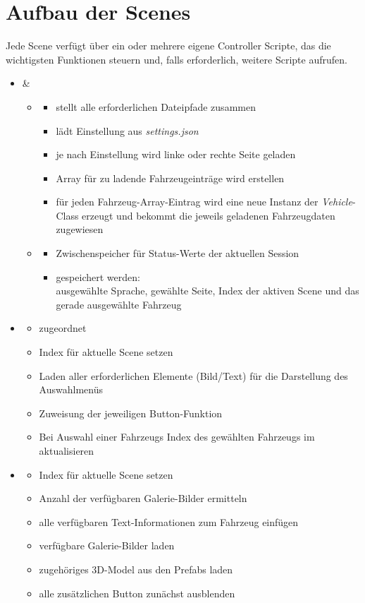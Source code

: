 \section{Aufbau der Scenes}
\label{sec:scenestruct}
%
Jede Scene verfügt über ein oder mehrere eigene Controller Scripte, das die wichtigsten Funktionen steuern und, falls erforderlich, weitere Scripte aufrufen.
%
\begin{itemize}
	\item \pres{} \rarr \dls{} \& \sss{}
	\begin{itemize}
		\item \dls{}
		\begin{itemize}
			\item stellt alle erforderlichen Dateipfade zusammen
			\item lädt Einstellung aus \emph{settings.json}
			\item je nach Einstellung wird linke oder rechte Seite geladen
			\item Array für zu ladende Fahrzeugeinträge wird erstellen
			\item für jeden Fahrzeug-Array-Eintrag wird eine neue Instanz der \emph{Vehicle}-Class erzeugt und bekommt die jeweils geladenen Fahrzeugdaten zugewiesen
		\end{itemize}
		\item \ssc{}
		\begin{itemize}
			\item Zwischenspeicher für Status-Werte der aktuellen Session
			\item gespeichert werden:\\
			ausgewählte Sprache, gewählte Seite, Index der aktiven Scene und das gerade ausgewählte Fahrzeug 
		\end{itemize}
	\end{itemize}
	\item \mms{} \rarr \mss{}
	\begin{itemize}
		\item \msco{} zugeordnet
		\item Index für aktuelle Scene setzen
		\item Laden aller erforderlichen Elemente (Bild/Text) für die Darstellung des Auswahlmenüs
		\item Zuweisung der jeweiligen Button-Funktion
		\item Bei Auswahl einer Fahrzeugs \rarr Index des gewählten Fahrzeugs im \sss{} aktualisieren
	\end{itemize}
	\item \vhs{} \rarr{} \vehss
	\begin{itemize}
		\item Index für aktuelle Scene setzen
		\item Anzahl der verfügbaren Galerie-Bilder ermitteln
		\item alle verfügbaren Text-Informationen zum Fahrzeug einfügen
		\item verfügbare Galerie-Bilder laden
		\item zugehöriges 3D-Model aus den Prefabs laden
		\item alle zusätzlichen Button zunächst ausblenden
	\end{itemize}
\end{itemize}
%
